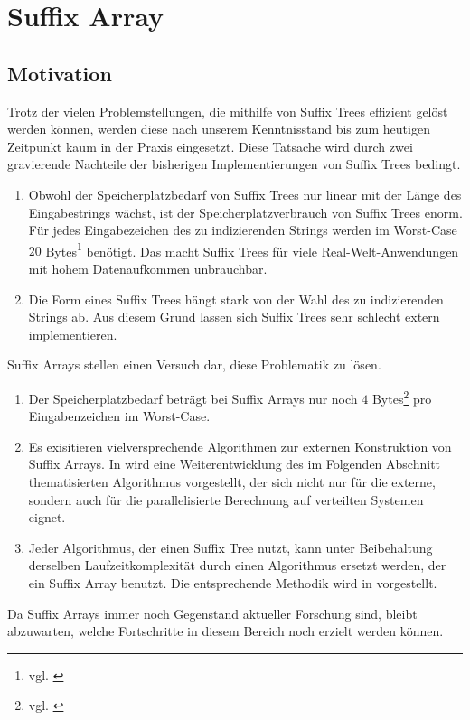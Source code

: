\documentclass[12pt]{report}
\begin{document}
\chapter{Suffix Array}
\label{sec:SuffixArray}

\section{Motivation}
\label{sec:Motivation}

Trotz der vielen Problemstellungen, die mithilfe von Suffix Trees effizient gelöst werden können, werden diese nach unserem Kenntnisstand bis zum heutigen Zeitpunkt kaum in der Praxis eingesetzt. Diese Tatsache wird durch zwei gravierende Nachteile der bisherigen Implementierungen von Suffix Trees bedingt.
\begin{enumerate}
    \item Obwohl der Speicherplatzbedarf von Suffix Trees nur linear mit der Länge des Eingabestrings wächst, ist der Speicherplatzverbrauch von Suffix Trees enorm. Für jedes Eingabezeichen des zu indizierenden Strings werden im Worst-Case $20$ Bytes\footnote{vgl. \cite{Giegerich1999}} benötigt. Das macht Suffix Trees für viele Real-Welt-Anwendungen mit hohem Datenaufkommen unbrauchbar.
    \item Die Form eines Suffix Trees hängt stark von der Wahl des zu indizierenden Strings ab. Aus diesem Grund lassen sich Suffix Trees sehr schlecht extern implementieren.
\end{enumerate}
Suffix Arrays stellen einen Versuch dar, diese Problematik zu lösen.
\begin{enumerate}
    \item Der Speicherplatzbedarf beträgt bei Suffix Arrays nur noch $4$ Bytes\footnote{vgl. \cite{Abouelhoda2004}} pro Eingabenzeichen im Worst-Case.
    \item Es exisitieren vielversprechende Algorithmen zur externen Konstruktion von Suffix Arrays. In \cite{Dementiev2008} wird eine Weiterentwicklung des im Folgenden Abschnitt thematisierten Algorithmus vorgestellt, der sich nicht nur für die externe, sondern auch für die parallelisierte Berechnung auf verteilten Systemen eignet.
    \item Jeder Algorithmus, der einen Suffix Tree nutzt, kann unter Beibehaltung derselben Laufzeitkomplexität durch einen Algorithmus ersetzt werden, der ein Suffix Array benutzt. Die entsprechende Methodik wird in \cite{Abouelhoda2004} vorgestellt.
\end{enumerate}
Da Suffix Arrays immer noch Gegenstand aktueller Forschung sind, bleibt abzuwarten, welche Fortschritte in diesem Bereich noch erzielt werden können.
\end{document}
